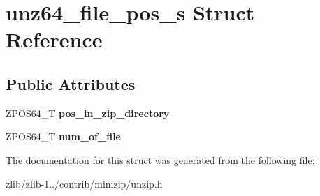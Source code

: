 \hypertarget{structunz64__file__pos__s}{\section{unz64\+\_\+file\+\_\+pos\+\_\+s Struct Reference}
\label{structunz64__file__pos__s}
}
\subsection*{Public Attributes}
\begin{DoxyCompactItemize}
\item 
\hypertarget{structunz64__file__pos__s_a56b202151059b18903fe46dacbfbf12d}{Z\+P\+O\+S64\+\_\+\+T {\bfseries pos\+\_\+in\+\_\+zip\+\_\+directory}}\label{structunz64__file__pos__s_a56b202151059b18903fe46dacbfbf12d}

\item 
\hypertarget{structunz64__file__pos__s_a3750057b6e72229a7acfb12b23bcb2fb}{Z\+P\+O\+S64\+\_\+\+T {\bfseries num\+\_\+of\+\_\+file}}\label{structunz64__file__pos__s_a3750057b6e72229a7acfb12b23bcb2fb}

\end{DoxyCompactItemize}


The documentation for this struct was generated from the following file\+:\begin{DoxyCompactItemize}
\item 
zlib/zlib-\/1../contrib/minizip/unzip.\+h\end{DoxyCompactItemize}
